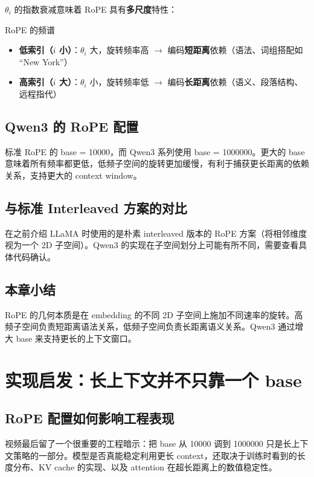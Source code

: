 \documentclass[a4paper]{article}
\begin{document}
$\theta_i$ 的指数衰减意味着 RoPE 具有\textbf{多尺度}特性：

\begin{importantbox}{RoPE 的频谱}
\begin{itemize}
  \item \textbf{低索引（$i$ 小）}：$\theta_i$ 大，旋转频率高 $\to$ 编码\textbf{短距离}依赖（语法、词组搭配如 ``New York''）
  \item \textbf{高索引（$i$ 大）}：$\theta_i$ 小，旋转频率低 $\to$ 编码\textbf{长距离}依赖（语义、段落结构、远程指代）
\end{itemize}
\end{importantbox}

\subsection{Qwen3 的 RoPE 配置}

标准 RoPE 的 base = 10000，而 Qwen3 系列使用 base = 1000000。更大的 base 意味着所有频率都更低，低频子空间的旋转更加缓慢，有利于捕获更长距离的依赖关系，支持更大的 context window。

\subsection{与标准 Interleaved 方案的对比}

在之前介绍 LLaMA 时使用的是朴素 interleaved 版本的 RoPE 方案（将相邻维度视为一个 2D 子空间）。Qwen3 的实现在子空间划分上可能有所不同，需要查看具体代码确认。

\subsection{本章小结}

RoPE 的几何本质是在 embedding 的不同 2D 子空间上施加不同速率的旋转。高频子空间负责短距离语法关系，低频子空间负责长距离语义关系。Qwen3 通过增大 base 来支持更长的上下文窗口。

\section{实现启发：长上下文并不只靠一个 base}
\subsection{RoPE 配置如何影响工程表现}
视频最后留了一个很重要的工程暗示：把 base 从 10000 调到 1000000 只是长上下文策略的一部分。模型是否真能稳定利用更长 context，还取决于训练时看到的长度分布、KV cache 的实现、以及 attention 在超长距离上的数值稳定性。
\end{document}
